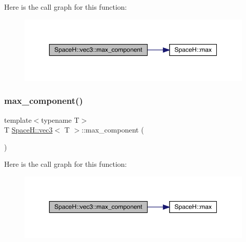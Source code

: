 Here is the call graph for this function\+:
\nopagebreak
\begin{figure}[H]
\begin{center}
\leavevmode
\includegraphics[width=350pt]{struct_space_h_1_1vec3_a5bf7ae47f97a2269748d66933d719bd9_cgraph}
\end{center}
\end{figure}
\mbox{\label{struct_space_h_1_1vec3_a5bf7ae47f97a2269748d66933d719bd9}} 
\subsubsection{\texorpdfstring{max\+\_\+component()}{max\_component()}\hspace{0.1cm}{\footnotesize\ttfamily [2/4]}}
{\footnotesize\ttfamily template$<$typename T$>$ \\
T \mbox{\hyperlink{struct_space_h_1_1vec3}{Space\+H\+::vec3}}$<$ T $>$\+::max\+\_\+component (\begin{DoxyParamCaption}{ }\end{DoxyParamCaption})\hspace{0.3cm}{\ttfamily [inline]}}

Here is the call graph for this function\+:
\nopagebreak
\begin{figure}[H]
\begin{center}
\leavevmode
\includegraphics[width=350pt]{struct_space_h_1_1vec3_a5bf7ae47f97a2269748d66933d719bd9_cgraph}
\end{center}
\end{figure}
\mbox{\label{struct_space_h_1_1vec3_a5bf7ae47f97a2269748d66933d719bd9}} 
